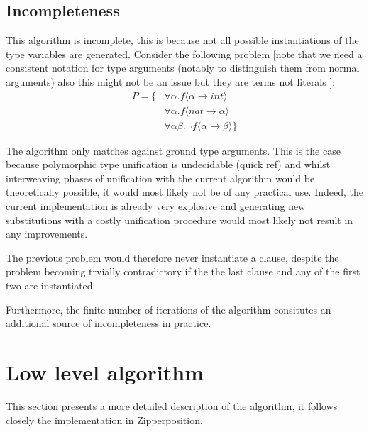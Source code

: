 \documentclass[]{ceurart}
\begin{document}
\subsection{Incompleteness}

This algorithm is incomplete, this is because not all possible instantiations of the type variables are generated.
Consider the following problem [note that we need a consistent notation for type arguments (notably to distinguish them from normal arguments) also this might not be an issue but they are terms not literals ]: 
\begin{align*}
   P = \{ & \forall \alpha. f \langle \alpha \rightarrow int \rangle \\
          & \forall \alpha. f \langle nat \rightarrow \alpha \rangle \\
          & \forall \alpha \beta. \lnot f \langle \alpha \rightarrow \beta \rangle \}
\end{align*}

The algorithm only matches against ground type arguments. This is the case because polymorphic type unification is undecidable (quick ref) and whilst interweaving phases of unification with the current algorithm would be theoretically possible, it would most likely not be of any practical use. Indeed, the current implementation is already very explosive and generating new substitutions with a costly unification procedure would most likely not result in any improvements.


The previous problem would therefore never instantiate a clause, despite the problem becoming trvially contradictory if the the last clause and any of the first two are instantiated.


Furthermore, the finite number of iterations of the algorithm consitutes an additional source of incompleteness in practice.

\section{Low level algorithm}

This section presents a more detailed description of the algorithm, it follows closely the implementation in Zipperposition.
\end{document}
